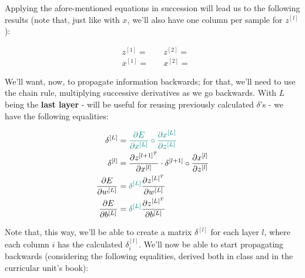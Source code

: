 \documentclass[12pt]{article}
\begin{document}
\begin{enumerate}[leftmargin=\labelsep]
        \pagebreak

        Applying the afore-mentioned equations in succession will lead us to the following results
        (note that, just like with $x$, we'll also have one column per sample
        for $z^{[l]}$):


        \begin{equation*}
          \begin{aligned}
             & z^{[1]} =  \quad
             & z^{[2]} =        \\
             & x^{[1]} =  \quad
             & x^{[2]} = 
          \end{aligned}
        \end{equation*}

        We'll want, now, to propagate information backwards; for that, we'll need to use
        the chain rule, multiplying successive derivatives as we go backwards.
        With $L$ being the \textbf{last layer} - will be useful for reusing previously
        calculated $\delta$'s - we have the following equalities:

        \begin{equation*}
          \begin{aligned}
            \delta^{[L]}                        & = \textcolor{teal}{\frac{\partial E}{\partial x^{[L]}} \circ
            \frac{\partial x^{[L]}}{\partial z^{[L]}}}                                                                             \\
            \delta^{[l]}                        & =
            \frac{\partial z^{[l + 1]^T}}{\partial x^{[l]}} \cdot \delta^{[l + 1]} \circ \frac{\partial x^{[l]}}{\partial z^{[l]}} \\
            \frac{\partial E}{\partial w^{[L]}} & = \textcolor{teal}{\delta^{[L]}}
            \frac{\partial z^{[L]^T}}{\partial w^{[L]}}                                                                            \\
            \frac{\partial E}{\partial b^{[L]}} & = \textcolor{teal}{\delta^{[L]}}
            \frac{\partial z^{[L]^T}}{\partial b^{[L]}}
          \end{aligned}
        \end{equation*}

        Note that, this way, we'll be able to create a matrix $\delta^{[l]}$ for each
        layer $l$, where each column $i$ has the calculated $\delta_i^{[l]}$.
        We'll now be able to start propagating backwards (considering the following equalities,
        derived both in class and in the curricular unit's book):


\end{enumerate}
\end{document}
